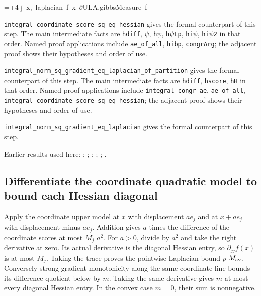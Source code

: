 \documentclass[11pt,a4paper]{report}
\newlength{\leancharwidth}
\newenvironment{leancode}{\par\smallskip\begingroup\ttfamily\footnotesize\raggedright
  \settowidth{\leancharwidth}{M}\setlength{\parskip}{0pt}\setlength{\parindent}{0pt}
  \frenchspacing}{\par\endgroup\smallskip}
\newcommand{\leanline}[2]{\hangindent=\dimexpr#1\leancharwidth+4\leancharwidth\relax
  \hangafter=1\noindent\hspace*{#1\leancharwidth}#2\par}
\newcommand{\leanlabel}[1]{\par\smallskip\noindent{\small\bfseries #1}\par}
\begin{document}
\begin{leanbox}
\begin{leancode}
\leanline{6}{∫\ x,\ laplacian\ f\ x\ ∂ULA.gibbsMeasure\ f}
\end{leancode}
\leanlabel{How the Lean proof follows the argument}
\texttt{integral\_\allowbreak{}coordinate\_\allowbreak{}score\_\allowbreak{}sq\_\allowbreak{}eq\_\allowbreak{}hessian} gives the formal counterpart of this step. The main intermediate facts are \texttt{hdiff}, \texttt{\ensuremath{\psi}}, \texttt{h\ensuremath{\psi}}, \texttt{h\ensuremath{\psi}\allowbreak{}Lp}, \texttt{hi\ensuremath{\psi}}, \texttt{hi\ensuremath{\psi}2} in that order. Named proof applications include \texttt{ae\_\allowbreak{}of\_\allowbreak{}all}, \texttt{hibp}, \texttt{congr\allowbreak{}Arg}; the adjacent proof shows their hypotheses and order of use.




\texttt{integral\_\allowbreak{}norm\_\allowbreak{}sq\_\allowbreak{}gradient\_\allowbreak{}eq\_\allowbreak{}laplacian\_\allowbreak{}of\_\allowbreak{}partition} gives the formal counterpart of this step. The main intermediate facts are \texttt{hdiff}, \texttt{hscore}, \texttt{h\allowbreak{}H} in that order. Named proof applications include \texttt{integral\_\allowbreak{}congr\_\allowbreak{}ae}, \texttt{ae\_\allowbreak{}of\_\allowbreak{}all}, \texttt{integral\_\allowbreak{}coordinate\_\allowbreak{}score\_\allowbreak{}sq\_\allowbreak{}eq\_\allowbreak{}hessian}; the adjacent proof shows their hypotheses and order of use.




\texttt{integral\_\allowbreak{}norm\_\allowbreak{}sq\_\allowbreak{}gradient\_\allowbreak{}eq\_\allowbreak{}laplacian} gives the formal counterpart of this step.
\end{leanbox}


Earlier results used here: \cite[Section~3.26.10]{LangevinLean2026ULASC}; \cite[Section~3.26.2]{LangevinLean2026ULASC}; \cite[Section~3.26.3]{LangevinLean2026ULASC}; \cite[Section~3.26.9]{LangevinLean2026ULASC}; \cite[Section~3.27.7]{LangevinLean2026ULASC}; \cite[Section~3.46.3]{LangevinLean2026ULASC}.
\subsection{\texorpdfstring{Differentiate the coordinate quadratic model to bound each Hessian diagonal}{Differentiate the coordinate quadratic model to bound each Hessian diagonal}}
\label{report-step-AverageLMC-ScoreMoment-lean-5}


Apply the coordinate upper model at \(x\) with displacement \(ae_j\) and at \(x+ae_j\) with displacement minus \(ae_j\). Addition gives \(a\) times the difference of the coordinate scores at most \(M_j\) \(a^2\). For \(a>0\), divide by \(a^2\) and take the right derivative at zero. Its actual derivative is the diagonal Hessian entry, so \(\partial_{jj}f(x)\) is at most \(M_j\). Taking the trace proves the pointwise Laplacian bound \(p\) \(M_{\rm av}\). Conversely strong gradient monotonicity along the same coordinate line bounds its difference quotient below by \(m\). Taking the same derivative gives \(m\) at most every diagonal Hessian entry. In the convex case \(m=0\), their sum is nonnegative.
\end{document}
